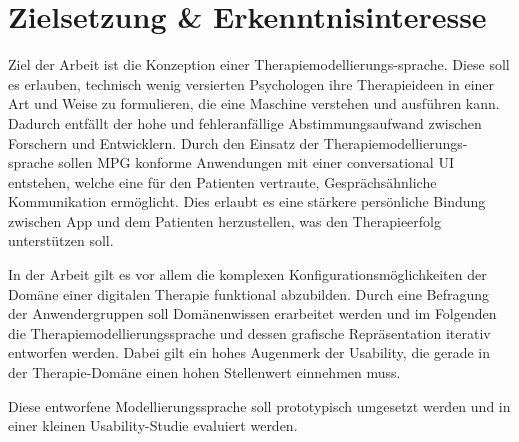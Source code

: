 
\section{Zielsetzung \& Erkenntnisinteresse}
\label{ch:Zielsetzung}


Ziel der Arbeit ist die Konzeption einer Therapiemodellierungs-sprache. Diese soll es erlauben, technisch wenig versierten Psychologen ihre Therapieideen in einer Art und Weise zu formulieren, die eine Maschine verstehen und ausführen kann. Dadurch entfällt der hohe und fehleranfällige Abstimmungsaufwand zwischen Forschern und Entwicklern. Durch den Einsatz der Therapiemodellierungs-sprache sollen MPG konforme Anwendungen mit einer conversational UI entstehen, welche eine für den Patienten vertraute,  Gesprächsähnliche Kommunikation ermöglicht. Dies erlaubt es eine stärkere persönliche Bindung zwischen App und dem Patienten herzustellen, was den Therapieerfolg unterstützen soll. 

In der Arbeit gilt es vor allem die komplexen Konfigurationsmöglichkeiten der Domäne einer digitalen Therapie funktional abzubilden. Durch eine Befragung der Anwendergruppen soll Domänenwissen erarbeitet werden und im Folgenden die Therapiemodellierungssprache und dessen grafische Repräsentation iterativ entworfen werden. Dabei gilt ein hohes Augenmerk der Usability, die gerade in der Therapie-Domäne einen hohen Stellenwert einnehmen muss.

Diese entworfene Modellierungssprache soll prototypisch umgesetzt werden und in einer kleinen Usability-Studie evaluiert werden.